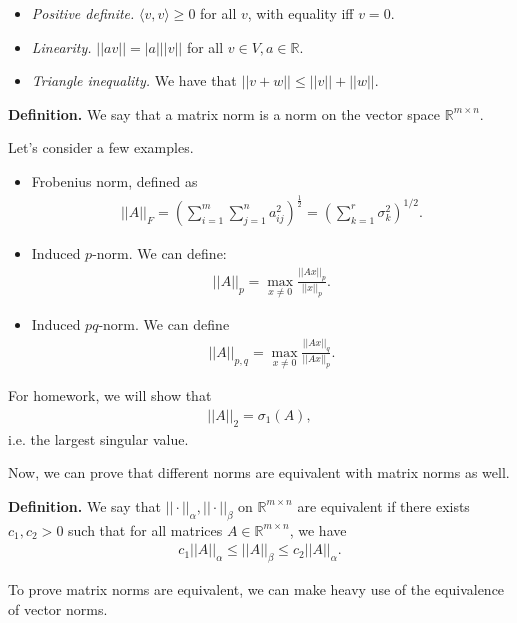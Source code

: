 \documentclass{article}
\newcommand{\RR}{\mathbb{R}}
\begin{document}
\begin{itemize}
  \item {\it Positive definite.} $\langle v, v\rangle \geq 0$ for all $v$, with equality iff $v = 0$.
  \item {\it Linearity.} $|| a v || = |a| ||v||$ for all $v \in V, a \in \RR$.
  \item {\it Triangle inequality.} We have that $||v + w || \leq ||v|| + ||w||$.
\end{itemize}

{\bf Definition.} We say that a matrix norm is a norm on the vector space $\RR^{m \times n}$.

Let's consider a few examples.

\begin{itemize}
  \item Frobenius norm, defined as
    \begin{align*}
      ||A||_F = \left( \sum_{i=1}^{m} \sum_{j=1}^{n} a_{ij}^2 \right)^{\frac{1}{2}} = ( \sum_{k=1}^{r} \sigma_k^2 )^{1/2}.
    \end{align*}
  \item Induced $p$-norm. We can define: 
    \begin{align*}
      ||A||_p = \max_{x \neq 0} \frac{||A x ||_p}{||x||_p}.
    \end{align*}
  \item Induced $pq$-norm.  We can define
    \begin{align*}
      ||A||_{p, q} = \max_{x \neq 0} \frac{||A x||_q}{||A x||_p}.
    \end{align*}
\end{itemize}

For homework, we will show that
\begin{align*}
  ||A||_2 = \sigma_1(A),
\end{align*}
i.e. the largest singular value.

Now, we can prove that different norms are equivalent with matrix norms as well.

{\bf Definition.} We say that $|| \cdot ||_{\alpha}, || \cdot ||_{\beta}$ on $\RR^{m \times n}$ are equivalent if there exists $c_1, c_2 > 0$ such that for all matrices $A \in \RR^{m \times n}$, we have
\begin{align*}
  c_1 ||A||_{\alpha} \leq ||A||_{\beta} \leq c_2 ||A||_{\alpha}.
\end{align*}

To prove matrix norms are equivalent, we can make heavy use of the equivalence of vector norms.
\end{document}
